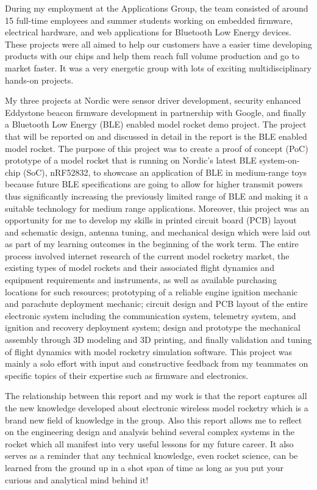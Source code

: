 \documentclass{workreport}
\begin{document}
\begin{frontmatter}
\begin{contributions}
  During my employment at the Applications Group, the team consisted of around 15 full-time employees and summer students working on embedded firmware, electrical hardware, and web applications for Bluetooth Low Energy devices. These projects were all aimed to help our customers have a easier time developing products with our chips and help them reach full volume production and go to market faster. It was a very energetic group with lots of exciting multidisciplinary hands-on projects.

	My three projects at Nordic were sensor driver development, security enhanced Eddystone beacon firmware development in partnership with Google, and finally a Bluetooth Low Energy (BLE) enabled model rocket demo project. The project that will be reported on and discussed in detail in the report is the BLE enabled model rocket. The purpose of this project was to create a proof of concept (PoC) prototype of a model rocket that is running on Nordic's latest BLE system-on-chip (SoC), nRF52832, to showcase an application of BLE in medium-range toys because future BLE specifications are going to allow for higher transmit powers thus significantly increasing the previously limited range of BLE and making it a suitable technology for medium range applications. Moreover, this project was an opportunity for me to develop my skills in printed circuit board (PCB) layout and schematic design, antenna tuning, and mechanical design which were laid out as part of my learning outcomes in the beginning of the work term. The entire process involved internet research of the current model rocketry market, the existing types of model rockets and their associated flight dynamics and equipment requirements and instruments, as well as available purchasing locations for such resources; prototyping of a reliable engine ignition mechanic and parachute deployment mechanic; circuit design and PCB layout of the entire electronic system including the communication system, telemetry system, and ignition and recovery deployment system; design and prototype the mechanical assembly through 3D modeling and 3D printing, and finally validation and tuning of flight dynamics with model rocketry simulation software. This project was mainly a solo effort with input and constructive feedback from my teammates on specific topics of their expertise such as firmware and electronics.

	The relationship between this report and my work is that the report captures all the new knowledge developed about electronic wireless model rocketry which is a brand new field of knowledge in the group. Also this report allows me to reflect on the engineering design and analysis behind several complex systems in the rocket which all manifest into very useful lessons for my future career. It also serves as a reminder that any technical knowledge, even rocket science, can be learned from the ground up in a shot span of time as long as you put your curious and analytical mind behind it!


\end{contributions}
\end{frontmatter}
\end{document}
